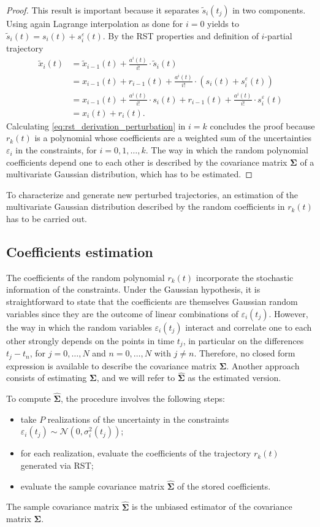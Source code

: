 \begin{proof}
This result is important because it separates $\tilde{s}_i(t_j)$ in two components. Using again Lagrange interpolation as done for $i=0$ yields to $\tilde{s}_i(t) = s_i(t)+s_i^{\varepsilon}(t)$. By the RST properties and definition of $i$-partial trajectory 
\begin{align}
\tilde{x}_i(t) &= \tilde{x}_{i-1}(t)+\frac{a^i(t)}{i!}\cdot \tilde{s}_i(t) \nonumber \\
&= x_{i-1}(t)+r_{i-1}(t)+ \frac{a^i(t)}{i!}\cdot (s_i(t)+s_i^{\varepsilon}(t)) \nonumber \\
&= x_{i-1}(t)+\frac{a^i(t)}{i!}\cdot s_i(t) + r_{i-1}(t)+ \frac{a^i(t)}{i!}\cdot s_i^{\varepsilon}(t) \nonumber \\
&= x_i(t)+r_i(t).
\label{eq:rst_derivation_perturbation}
\end{align}
Calculating \eqref{eq:rst_derivation_perturbation} in $i=k$ concludes the proof because $r_k(t)$ is a polynomial whose coefficients are a weighted sum of the uncertainties $\varepsilon_i$ in the constraints, for $i=0,1,\dots,k$. The way in which the random polynomial coefficients depend one to each other is described by the covariance matrix $\mathbf{\Sigma}$ of a multivariate Gaussian distribution, which has to be estimated.
\end{proof}
To characterize and generate new perturbed trajectories, an estimation of the multivariate Gaussian distribution described by the random coefficients in $r_k(t)$ has to be carried out.

\subsection{Coefficients estimation}
The coefficients of the random polynomial $r_k(t)$ incorporate the stochastic information of the constraints. 
Under the Gaussian hypothesis, it is straightforward to state that the coefficients are themselves Gaussian random variables since they are the outcome of linear combinations of $\varepsilon_i(t_j)$. However, the way in which the random variables $\varepsilon_i(t_j)$ interact and correlate one to each other strongly depends on the points in time $t_j$, in particular on the differences $t_j-t_n$, for $j=0,\dots,N$ and $n=0,\dots,N$ with $j\neq n$. Therefore, no closed form expression is available to describe the covariance matrix $\mathbf{\Sigma}$. Another approach consists of estimating $\mathbf{\Sigma}$, and we will refer to $\mathbf{\hat{\Sigma}}$ as the estimated version.

To compute $\mathbf{\hat{\Sigma}}$, the procedure involves the following steps:
\begin{itemize}
\item take $P$ realizations of the uncertainty in the constraints $\varepsilon_i(t_j)\sim \mathcal{N}(0,\sigma^2_{i}(t_j))$;
\item for each realization, evaluate the coefficients of the trajectory $r_{k}(t)$ generated via RST;
\item evaluate the sample covariance matrix $\mathbf{\hat{\Sigma}}$ of the stored coefficients.
\end{itemize}
The sample covariance matrix $\mathbf{\hat{\Sigma}}$ is the unbiased estimator of the covariance matrix $\mathbf{\Sigma}$.

